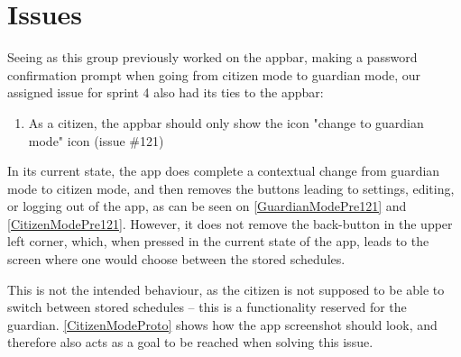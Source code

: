 \section{Issues}
Seeing as this group previously worked on the appbar, making a password confirmation prompt when going from citizen mode to guardian mode, our assigned issue for sprint 4 also had its ties to the appbar:

\begin{enumerate}
  \item As a citizen, the appbar should only show the icon "change to guardian mode" icon (issue \#121)
\end{enumerate}

In its current state, the app does complete a contextual change from guardian mode to citizen mode, and then removes the buttons leading to settings, editing, or logging out of the app, as can be seen on \autoref{GuardianModePre121} and \autoref{CitizenModePre121}.
However, it does not remove the back-button in the upper left corner, which, when pressed in the current state of the app, leads to the screen where one would choose between the stored schedules.


This is not the intended behaviour, as the citizen is not supposed to be able to switch between stored schedules -- this is a functionality reserved for the guardian.
\autoref{CitizenModeProto} shows how the app screenshot should look, and therefore also acts as a goal to be reached when solving this issue.

